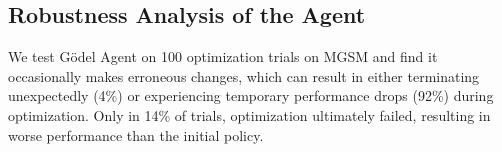 \documentclass[11pt]{article}
\newcommand{\framework}{Gödel Agent\xspace}
\begin{document}






\subsection{Robustness Analysis of the Agent}

We test \framework on 100 optimization trials on MGSM and find it occasionally makes erroneous changes, which can result in either terminating unexpectedly (4\%) or experiencing temporary performance drops (92\%) during optimization. Only in 14\% of trials, optimization ultimately failed, resulting in worse performance than the initial policy. 
\end{document}
